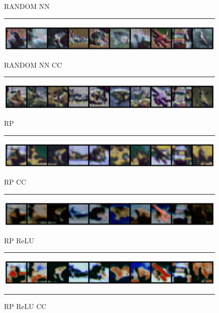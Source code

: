 \begin{figure}[h]
    \centering
    \setlength{\abovecaptionskip}{0pt plus 0pt minus 0pt}
    \setlength{\belowcaptionskip}{10pt plus 0pt minus 0pt}
    \caption*{\normalsize{RANDOM NN}}
    \rule{0.4\textwidth}{.4pt}
    
    \centerline{\hspace*{8mm}\includegraphics[width=1.4\textwidth]{figures/reconstruction_CIFAR10_RANDOM_NN_epoch_100.png}}
    \caption*{\normalsize{RANDOM NN CC}}
    \rule{0.4\textwidth}{.4pt}
    
    \centerline{\hspace*{8mm}\includegraphics[width=1.4\textwidth]{figures/reconstruction_CIFAR10_RANDOM_NN_CC_epoch_100.png}}
    \caption*{\normalsize{RP}}
    \rule{0.4\textwidth}{.4pt}
    
    \centerline{\hspace*{8mm}\includegraphics[width=1.4\textwidth]{figures/reconstruction_CIFAR10_RP_epoch_100.png}}
    \caption*{\normalsize{RP CC}}
    \rule{0.4\textwidth}{.4pt}
    
    \centerline{\hspace*{8mm}\includegraphics[width=1.4\textwidth]{figures/reconstruction_CIFAR10_RP_CC_epoch_100.png}}
    \caption*{\normalsize{RP ReLU}}
    \rule{0.4\textwidth}{.4pt}
    
    \centerline{\hspace*{8mm}\includegraphics[width=1.4\textwidth]{figures/reconstruction_CIFAR10_RP_ReLU_epoch_100.png}}
    \caption*{\normalsize{RP ReLU CC}}
    \rule{0.4\textwidth}{.4pt}
    

\end{figure}
